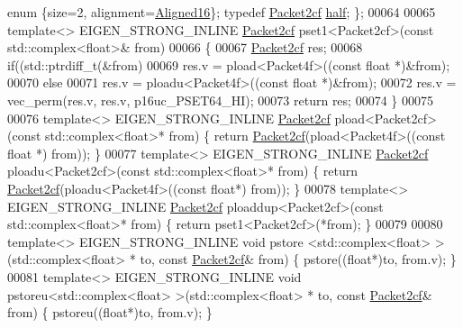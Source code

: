 \begin{DoxyCode}
{      enum} \{size=2, alignment=\hyperlink{group__enums_gga45fe06e29902b7a2773de05ba27b47a1af8e2bf74b04c02199f62c5e3c06dbfcc}{Aligned16}\}; \textcolor{keyword}{typedef} \hyperlink{struct_eigen_1_1internal_1_1_packet2cf}{Packet2cf} \hyperlink{struct_eigen_1_1internal_1_1_packet2cf}{half}; \};
00064 
00065 \textcolor{keyword}{template}<> EIGEN\_STRONG\_INLINE \hyperlink{struct_eigen_1_1internal_1_1_packet2cf}{Packet2cf} pset1<Packet2cf>(\textcolor{keyword}{const} std::complex<float>&  from)
00066 \{
00067   \hyperlink{struct_eigen_1_1internal_1_1_packet2cf}{Packet2cf} res;
00068   \textcolor{keywordflow}{if}((std::ptrdiff\_t(&from) %
00069     res.v = pload<Packet4f>((\textcolor{keyword}{const} \textcolor{keywordtype}{float} *)&from);
00070   \textcolor{keywordflow}{else}
00071     res.v = ploadu<Packet4f>((\textcolor{keyword}{const} \textcolor{keywordtype}{float} *)&from);
00072   res.v = vec\_perm(res.v, res.v, p16uc\_PSET64\_HI);
00073   \textcolor{keywordflow}{return} res;
00074 \}
00075 
00076 \textcolor{keyword}{template}<> EIGEN\_STRONG\_INLINE \hyperlink{struct_eigen_1_1internal_1_1_packet2cf}{Packet2cf} pload<Packet2cf>(\textcolor{keyword}{const} std::complex<float>*        from) 
      \{ \textcolor{keywordflow}{return} \hyperlink{struct_eigen_1_1internal_1_1_packet2cf}{Packet2cf}(pload<Packet4f>((\textcolor{keyword}{const} \textcolor{keywordtype}{float} *) from)); \}
00077 \textcolor{keyword}{template}<> EIGEN\_STRONG\_INLINE \hyperlink{struct_eigen_1_1internal_1_1_packet2cf}{Packet2cf} ploadu<Packet2cf>(\textcolor{keyword}{const} std::complex<float>*       from) 
      \{ \textcolor{keywordflow}{return} \hyperlink{struct_eigen_1_1internal_1_1_packet2cf}{Packet2cf}(ploadu<Packet4f>((\textcolor{keyword}{const} \textcolor{keywordtype}{float}*) from)); \}
00078 \textcolor{keyword}{template}<> EIGEN\_STRONG\_INLINE \hyperlink{struct_eigen_1_1internal_1_1_packet2cf}{Packet2cf} ploaddup<Packet2cf>(\textcolor{keyword}{const} std::complex<float>*     from) 
      \{ \textcolor{keywordflow}{return} pset1<Packet2cf>(*from); \}
00079 
00080 \textcolor{keyword}{template}<> EIGEN\_STRONG\_INLINE \textcolor{keywordtype}{void} pstore <std::complex<float> >(std::complex<float> *   to, \textcolor{keyword}{const} 
      \hyperlink{struct_eigen_1_1internal_1_1_packet2cf}{Packet2cf}& from) \{ pstore((\textcolor{keywordtype}{float}*)to, from.v); \}
00081 \textcolor{keyword}{template}<> EIGEN\_STRONG\_INLINE \textcolor{keywordtype}{void} pstoreu<std::complex<float> >(std::complex<float> *   to, \textcolor{keyword}{const} 
      \hyperlink{struct_eigen_1_1internal_1_1_packet2cf}{Packet2cf}& from) \{ pstoreu((\textcolor{keywordtype}{float}*)to, from.v); \}

\end{DoxyCode}
